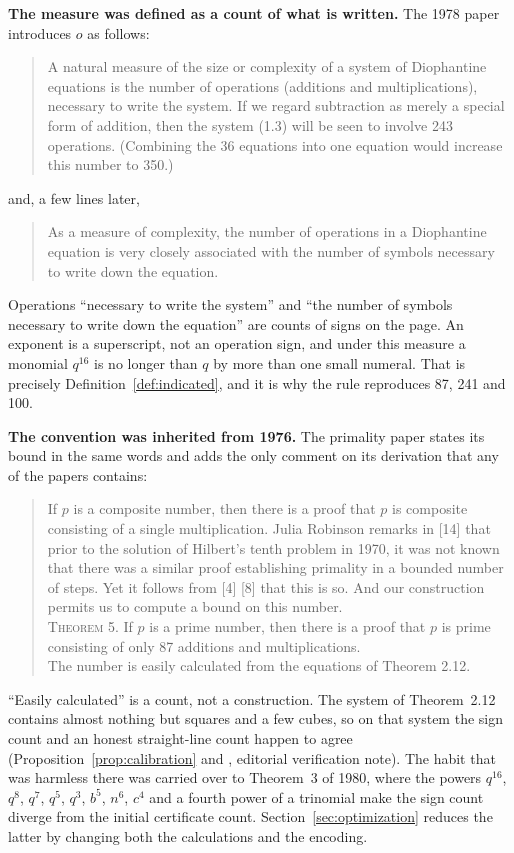 \documentclass[11pt,letterpaper]{article}
\theoremstyle{definition}
\theoremstyle{remark}
\numberwithin{equation}{section}
\begin{document}
\medskip\noindent\textbf{The measure was defined as a count of what is
written.} The 1978 paper introduces $o$ as follows:
\begin{quote}\small
A natural measure of the size or complexity of a system of Diophantine
equations is the number of operations (additions and multiplications),
necessary to write the system. If we regard subtraction as merely a special
form of addition, then the system (1.3) will be seen to involve 243
operations. (Combining the 36 equations into one equation would increase
this number to 350.) \hfill\cite[p.~338]{J78}
\end{quote}
and, a few lines later,
\begin{quote}\small
As a measure of complexity, the number of operations in a Diophantine
equation is very closely associated with the number of symbols necessary to
write down the equation. \hfill\cite[p.~338]{J78}
\end{quote}
Operations ``necessary to write the system'' and ``the number of symbols
necessary to write down the equation'' are counts of signs on the page. An
exponent is a superscript, not an operation sign, and under this measure a
monomial $q^{16}$ is no longer than $q$ by more than one small numeral. That
is precisely Definition~\ref{def:indicated}, and it is why the rule
reproduces 87, 241 and 100.

\medskip\noindent\textbf{The convention was inherited from 1976.} The
primality paper states its bound in the same words and adds the only comment
on its derivation that any of the papers contains:
\begin{quote}\small
If $p$ is a composite number, then there is a proof that $p$ is composite
consisting of a single multiplication. Julia Robinson remarks in [14] that
prior to the solution of Hilbert's tenth problem in 1970, it was not known
that there was a similar proof establishing primality in a bounded number of
steps. Yet it follows from [4] [8] that this is so. And our construction
permits us to compute a bound on this number.\\
\textsc{Theorem 5.} If $p$ is a prime number, then there is a proof that $p$
is prime consisting of only 87 additions and multiplications.\\
The number is easily calculated from the equations of Theorem 2.12.
\hfill\cite[p.~451]{JSWW}
\end{quote}
``Easily calculated'' is a count, not a construction. The system of
Theorem~2.12 contains almost nothing but squares and a few cubes, so on that
system the sign count and an honest straight-line count happen to agree
(Proposition~\ref{prop:calibration} and \cite[\S1]{JSWW}, editorial verification note).
The habit that was harmless there was carried over to Theorem~3 of 1980,
where the powers $q^{16}$, $q^8$, $q^7$, $q^5$, $q^3$, $b^5$, $n^6$, $c^4$
and a fourth power of a trinomial make the sign count diverge from the
initial certificate count. Section~\ref{sec:optimization} reduces the
latter by changing both the calculations and the encoding.
\end{document}
